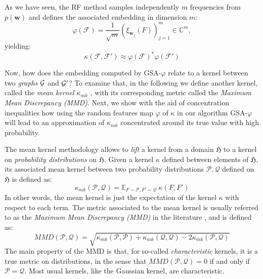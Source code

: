 As we have seen, the RF method samples independently $m$ frequencies from $p(\mathbf{w})$ and defines the associated embedding in dimension $m$:
\begin{equation}\label{eq:RF}
\varphi(\mathcal{F}) = \frac{1}{\sqrt{m}} ( \xi_{\mathbf{w}_j}(F) )_{j=1}^m \in \mathbb{C}^m,
\end{equation}
yielding:
\[
\kappa(\mathcal{F},\mathcal{F}')\approx \varphi(\mathcal{F})^*\varphi(\mathcal{F}')
\]

Now, how does the embedding computed by GSA-$\varphi$ relate to a kernel between two \emph{graphs} $\mathcal{G}$ and $\mathcal{G}'$? To examine that, in the following we define another kernel, called the \emph{mean kernel} $\kappa_{mk}$ \citep{gretton}, with its corresponding metric called the \emph{Maximum Mean Discrepancy (MMD)}. Next, we show with the aid of concentration inequalities how using the random features map $\varphi$ of $\kappa$ in our algorithm GSA-$\varphi$ will lead to an approximation of $\kappa_{mk}$ concentrated around its true value with high probability.

The mean kernel methodology allows to \emph{lift} a kernel from a domain $\mathfrak{H}$ to a kernel on \emph{probability distributions} on $\mathfrak{H}$. Given a kernel $\kappa$ defined between elements of  $\mathfrak{H}$, its associated mean kernel between two probability distributions $\mathcal{P},\mathcal{Q}$ defined on $\mathfrak{H}$ is defined as:
\begin{equation}
\label{eq:mean_kernel}
\kappa_{mk}(\mathcal{P},\mathcal{Q}) = \mathbb{E}_{F \sim \mathcal{P}, F' \sim \mathcal{Q}}~ \kappa(F,F')
\end{equation}
In other words, the mean kernel is just the expectation of the kernel $\kappa$ with respect to each term. The metric associated to the mean kernel is usually referred to as the \emph{Maximum Mean Discrepancy (MMD)} in the literature \citep{gretton}, and is defined as:
\begin{equation}\label{eq:MMD}
MMD(\mathcal{P},\mathcal{Q}) = \sqrt{\kappa_{mk}(\mathcal{P},\mathcal{P}) + \kappa_{mk}(\mathcal{Q},\mathcal{Q}) - 2\kappa_{mk}(\mathcal{P},\mathcal{Q})}
\end{equation}
The main property of the MMD is that, for so-called \emph{characteristic} kernels, it is a true metric on distributions, in the sense that $MMD(\mathcal{P}, \mathcal{Q}) = 0$ if and only if $\mathcal{P} = \mathcal{Q}$. Most usual kernels, like the Gaussian kernel, are characteristic.

